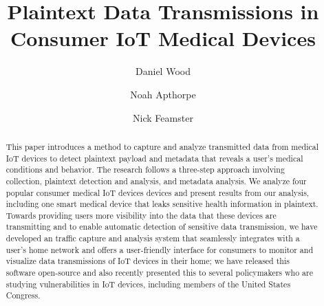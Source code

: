 \documentclass[sigconf]{acmart}
\begin{document}
\title{Plaintext Data Transmissions in Consumer IoT Medical Devices} %
\author{Daniel Wood}
\author{Noah Apthorpe}
\author{Nick Feamster}

\renewcommand{\shortauthors}{D. Wood et al.}


\begin{abstract} 
This paper introduces a method to
capture and analyze transmitted data from medical IoT devices to detect plaintext
payload and metadata that reveals a user's
medical conditions and
behavior. 
The research follows a three-step approach involving collection, plaintext detection
and analysis, and metadata analysis. 
We analyze four popular consumer medical IoT devices devices and present 
results from our analysis, including one smart medical device that leaks sensitive
health information in plaintext. 
Towards providing users more visibility into the data that these devices are transmitting
and to enable automatic detection of sensitive data transmission,
we have developed an traffic capture and analysis system that seamlessly integrates
with a user's home network and offers
a user-friendly interface for consumers to monitor and visualize data transmissions
of IoT devices in their home; we have released this software open-source and also
recently presented this to several policymakers who are studying vulnerabilities
in IoT devices, including members of the United States Congress.
\end{abstract}


\maketitle


\pagebreak

\balance
\end{document}
